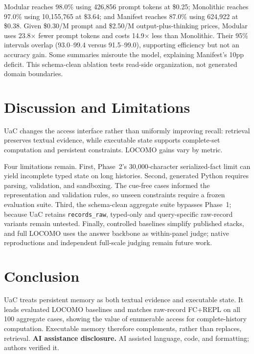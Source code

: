 \documentclass[letterpaper]{article} %
\begin{document}
Modular reaches 98.0\% using 426{,}856 prompt tokens at \$0.25; Monolithic reaches 97.0\% using 10{,}155{,}765 at \$3.64; and Manifest reaches 87.0\% using 624{,}922 at \$0.38. Given \$0.30/M prompt and \$2.50/M output-plus-thinking prices, Modular uses 23.8$\times$ fewer prompt tokens and costs 14.9$\times$ less than Monolithic. Their 95\% intervals overlap (93.0--99.4 versus 91.5--99.0), supporting efficiency but not an accuracy gain. Some summaries misroute the model, explaining Manifest's 10pp deficit. This schema-clean ablation tests read-side organization, not generated domain boundaries.

\section{Discussion and Limitations}

UaC changes the access interface rather than uniformly improving recall: retrieval preserves textual evidence, while executable state supports complete-set computation and persistent constraints. LOCOMO gains vary by metric.

Four limitations remain. First, Phase~2's 30{,}000-character serialized-fact limit can yield incomplete typed state on long histories. Second, generated Python requires parsing, validation, and sandboxing. The cue-free cases informed the representation and validation rules, so unseen constraints require a frozen evaluation suite. Third, the schema-clean aggregate suite bypasses Phase~1; because UaC retains \texttt{records\_raw}, typed-only and query-specific raw-record variants remain untested. Finally, controlled baselines simplify published stacks, and full LOCOMO uses the answer backbone as within-panel judge; native reproductions and independent full-scale judging remain future work.

\section{Conclusion}

UaC treats persistent memory as both textual evidence and executable state. It leads evaluated LOCOMO baselines and matches raw-record FC+REPL on all 100 aggregate cases, showing the value of enumerable access for complete-history computation. Executable memory therefore complements, rather than replaces, retrieval. \textbf{AI assistance disclosure.} AI assisted language, code, and formatting; authors verified it.



\end{document}
